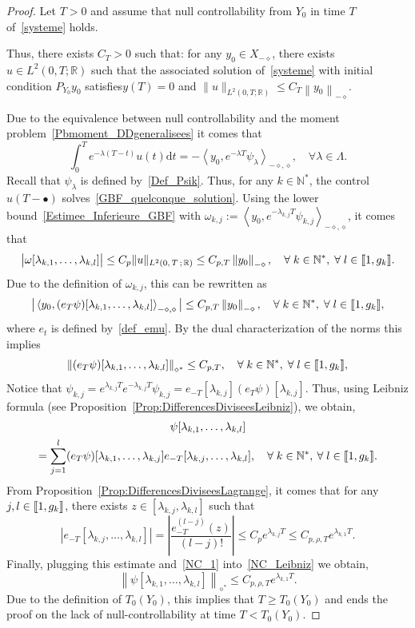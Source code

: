 \documentclass[AHL,Unicode,longabstracts]{cedram}
\newcommand{\llbracket}{\mathopen{[\mkern -2.7mu[}}
\newcommand{\rrbracket}{\mathclose{]\mkern -2.7mu]}}
\newcommand{\inter}[2]{\llbracket #1,#2 \rrbracket}
\newcommand{\Xmalpha}{X_{-\diamond}}
\newcommand{\Fzp}{Y_0}
\newcommand{\normeXalphas}[1]{\left\| #1 \right\|_{\diamond^*}}
\newcommand{\normeXmalpha}[1]{\left\| #1 \right\|_{-\diamond}}
\newcommand{\dual}[2]{\left\langle #1, #2 \right\rangle_{-\diamond,\diamond}}
\newcommand{\PF}{P_{\Fzp}}
\newcommand{\n}{g}
\newcommand{\N}{\mathbb{N}}
\newcommand{\R}{\mathbb{R}}
\newcommand{\md}{\mathrm{d}}
\renewcommand{\cdot}{{\scriptstyle \bullet}}
\let\oldforall\forall
\renewcommand*{\forall}{\mathrel{\oldforall}}
\begin{document}
\begin{proof}
Let $T>0$ and assume that null controllability from $\Fzp$ in time $T$ of~\eqref{systeme} holds.

Thus, there exists $C_T >0$ such that: for any $y_0 \in \Xmalpha$, there exists $u \in L^2(0,T ;\R)$ such that the associated solution of~\eqref{systeme} with initial condition $\PF y_0$ satisfies\linebreak$y(T)=0$ and $ \| u \|_{L^2(0,T ; \R)} \leq C_T \normeXmalpha{y_0}$.

Due to the equivalence between null controllability and the moment problem~\eqref{Pbmoment_DDgeneralisees} it comes that
\[
\int_0^T e^{-\lambda (T-t)} u(t) \md t = - \dual{y_0}{e^{-\lambda T} \psi_\lambda}, \quad \forall \lambda \in \Lambda.
\]
Recall that $\psi_\lambda$ is defined by~\eqref{Def_Psik}. Thus, for any $k \in \N^*$, the control $u(T-\cdot)$ solves~\eqref{GBF_quelconque_solution}. Using the lower bound~\eqref{Estimee_Inferieure_GBF} with $\omega_{k,j} := \dual{y_0}{e^{-\lambda_{k,j} T} \psi_{k,j}}$, it comes that
\[
\big| \omega[\lambda_{k,1}, \dots, \lambda_{k,l}] \big| \leq C_p \| u \|_{L^2(0,\,T\,;\,\R)} \leq C_{p,T} \normeXmalpha{y_0},
\quad \forall k \in \N^*, \; \forall l \in \inter{1}{\n_k}.
\]
Due to the definition of $\omega_{k,j}$, this can be rewritten as
\[
\big| \dual{y_0}{ (e_T \psi)[\lambda_{k,1}, \dots, \lambda_{k,l}]} \big| \leq C_{p,T} \normeXmalpha{y_0},
\quad \forall k \in \N^*, \; \forall l \in \inter{1}{\n_k},
\]
where $e_t$ is defined by~\eqref{def_emu}. By the dual characterization of the norms this implies
\begin{equation}\label{NC_1}
\normeXalphas{(e_T \psi)[\lambda_{k,1}, \dots, \lambda_{k,l}]} \leq C_{p,T},
\quad \forall k \in \N^*, \; \forall l \in \inter{1}{\n_k},
\end{equation}
Notice that $\psi_{k,j} = e^{\lambda_{k,j} T} e^{-\lambda_{k,j} T}\psi_{k,j} = e_{-T}[\lambda_{k,j}] (e_T \psi)[\lambda_{k,j}]$. Thus, using Leibniz formula (see Proposition~\ref{Prop:DifferencesDiviseesLeibniz}), we obtain,
\begin{multline}\label{NC_Leibniz}
\psi[\lambda_{k,1}, \dots, \lambda_{k,l}]\\
= \sum_{j=1}^l (e_T \psi)[\lambda_{k,1}, \dots, \lambda_{k,j}] e_{-T}[\lambda_{k,j}, \dots,\lambda_{k,l}],
\quad \forall k \in \N^*, \: \forall l \in \inter{1}{\n_k}.
\end{multline}
From Proposition~\ref{Prop:DifferencesDiviseesLagrange}, it comes that for any $j,l \in \inter{1}{\n_k}$, there exists $z \in [\lambda_{k,j}, \lambda_{k,l}]$ such that
\[
\left| e_{-T} [\lambda_{k,j}, \dots, \lambda_{k,l}] \right| = \left| \frac{e_{-T}^{(l-j)}(z)}{(l-j)!} \right| \leq C_p e^{\lambda_{k,j} T} \leq C_{p, \rho, T} e^{\lambda_{k,1} T}.
\]
Finally, plugging this estimate and~\eqref{NC_1} into~\eqref{NC_Leibniz} we obtain,
\[
\normeXalphas{\psi[\lambda_{k,1}, \dots, \lambda_{k,l}]} \leq C_{p, \rho, T} e^{\lambda_{k,1}T}.
\]
Due to the definition of $T_0(\Fzp)$, this implies that $T \geq T_0(\Fzp)$ and ends the proof on the lack of null-controllability at time $T<T_0(\Fzp)$.
\end{proof}
\end{document}
